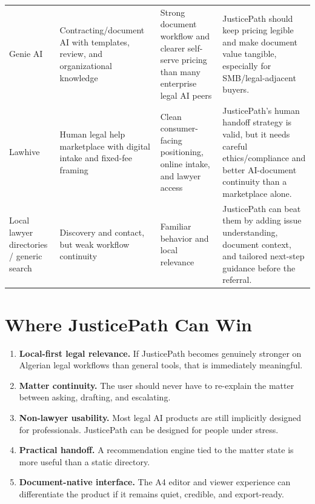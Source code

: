\documentclass[11pt]{article}
\begin{document}
\begin{longtable}{p{} p{} p{} p{}}
Genie AI & Contracting/document AI with templates, review, and organizational knowledge & Strong document workflow and clearer self-serve pricing than many enterprise legal AI peers & JusticePath should keep pricing legible and make document value tangible, especially for SMB/legal-adjacent buyers. \\

Lawhive & Human legal help marketplace with digital intake and fixed-fee framing & Clean consumer-facing positioning, online intake, and lawyer access & JusticePath's human handoff strategy is valid, but it needs careful ethics/compliance and better AI-document continuity than a marketplace alone. \\

Local lawyer directories / generic search & Discovery and contact, but weak workflow continuity & Familiar behavior and local relevance & JusticePath can beat them by adding issue understanding, document context, and tailored next-step guidance before the referral. \\

\bottomrule
\end{longtable}

\section*{Where JusticePath Can Win}
\begin{enumerate}[leftmargin=1.4em]
  \item \textbf{Local-first legal relevance.} If JusticePath becomes genuinely stronger on Algerian legal workflows than general tools, that is immediately meaningful.
  \item \textbf{Matter continuity.} The user should never have to re-explain the matter between asking, drafting, and escalating.
  \item \textbf{Non-lawyer usability.} Most legal AI products are still implicitly designed for professionals. JusticePath can be designed for people under stress.
  \item \textbf{Practical handoff.} A recommendation engine tied to the matter state is more useful than a static directory.
  \item \textbf{Document-native interface.} The A4 editor and viewer experience can differentiate the product if it remains quiet, credible, and export-ready.
\end{enumerate}
\end{document}
